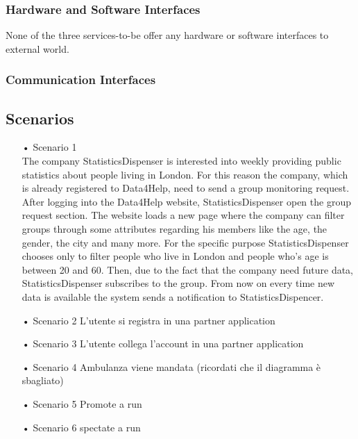 \subsubsection{Hardware and Software Interfaces}
None of the three services-to-be offer any hardware or software interfaces to external world.
\subsubsection{Communication Interfaces}
\subsection{Scenarios}
\begin{enumerate}
\item[•]{\Large Scenario 1} \\
The company StatisticsDispenser is interested into weekly providing public statistics about people living in London. For this reason the company, which is already registered to Data4Help, need to send a group monitoring request. After logging into the Data4Help website, StatisticsDispenser open the group request section. The website loads a new page where the company can filter groups through some attributes regarding his members like the age, the gender, the city and many more. For the specific purpose StatisticsDispenser chooses only to filter people who live in London and people who's age is between 20 and 60. Then, due to the fact that the company need future data, StatisticsDispenser subscribes to the group. From now on every time new data is available the system sends a notification to StatisticsDispencer. 
\item[•]{\Large Scenario 2}
L'utente si registra in una partner application
\item[•]{\Large Scenario 3}
L'utente collega l'account in una partner application
\item[•]{\Large Scenario 4}
Ambulanza viene mandata (ricordati che il diagramma è sbagliato)
\item[•]{\Large Scenario 5}
Promote a run
\item[•]{\Large Scenario 6}
spectate a run

\end{enumerate}

